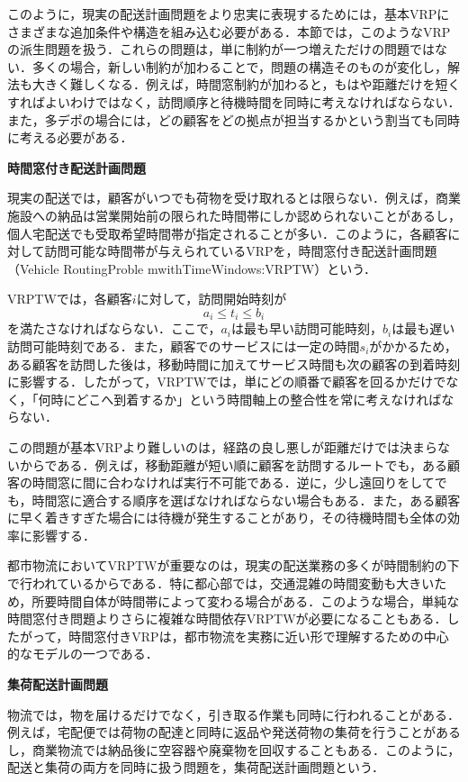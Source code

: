 このように，現実の配送計画問題をより忠実に表現するためには，基本VRPにさまざまな追加条件や構造を組み込む必要がある．本節では，このようなVRPの派生問題を扱う．これらの問題は，単に制約が一つ増えただけの問題ではない．多くの場合，新しい制約が加わることで，問題の構造そのものが変化し，解法も大きく難しくなる．例えば，時間窓制約が加わると，もはや距離だけを短くすればよいわけではなく，訪問順序と待機時間を同時に考えなければならない．また，多デポの場合には，どの顧客をどの拠点が担当するかという割当ても同時に考える必要がある．



\textbf{時間窓付き配送計画問題}

現実の配送では，顧客がいつでも荷物を受け取れるとは限らない．例えば，商業施設への納品は営業開始前の限られた時間帯にしか認められないことがあるし，個人宅配送でも受取希望時間帯が指定されることが多い．このように，各顧客に対して訪問可能な時間帯が与えられているVRPを，時間窓付き配送計画問題（Vehicle RoutingProble mwithTimeWindows:VRPTW）という\cite{KOSKOSIDIS199269}．

VRPTWでは，各顧客$i$に対して，訪問開始時刻が
\begin{equation}
a_i\le t_i\le b_i
\end{equation}
を満たさなければならない．ここで，$a_i$は最も早い訪問可能時刻，$b_i$は最も遅い訪問可能時刻である．また，顧客でのサービスには一定の時間$s_i$がかかるため，ある顧客を訪問した後は，移動時間に加えてサービス時間も次の顧客の到着時刻に影響する．したがって，VRPTWでは，単にどの順番で顧客を回るかだけでなく，「何時にどこへ到着するか」という時間軸上の整合性を常に考えなければならない．

この問題が基本VRPより難しいのは，経路の良し悪しが距離だけでは決まらないからである．例えば，移動距離が短い順に顧客を訪問するルートでも，ある顧客の時間窓に間に合わなければ実行不可能である．逆に，少し遠回りをしてでも，時間窓に適合する順序を選ばなければならない場合もある．また，ある顧客に早く着きすぎた場合には待機が発生することがあり，その待機時間も全体の効率に影響する．

都市物流においてVRPTWが重要なのは，現実の配送業務の多くが時間制約の下で行われているからである．特に都心部では，交通混雑の時間変動も大きいため，所要時間自体が時間帯によって変わる場合がある．このような場合，単純な時間窓付き問題よりさらに複雑な時間依存VRPTWが必要になることもある．したがって，時間窓付きVRPは，都市物流を実務に近い形で理解するための中心的なモデルの一つである．

\textbf{集荷配送計画問題}

物流では，物を届けるだけでなく，引き取る作業も同時に行われることがある．例えば，宅配便では荷物の配達と同時に返品や発送荷物の集荷を行うことがあるし，商業物流では納品後に空容器や廃棄物を回収することもある．このように，配送と集荷の両方を同時に扱う問題を，集荷配送計画問題という\cite{MOSHEIOV1998669}．

